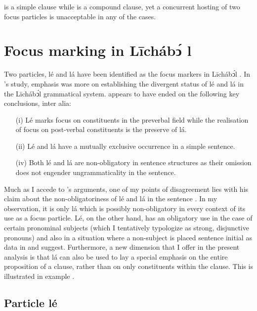 \documentclass[output=paper,colorlinks,citecolor=brown]{langscibook}
\begin{document}
 is a simple clause while  is a compound clause, yet a concurrent hosting of two focus particles is unacceptable in any of the cases.

\section{Focus marking in Līchábͻ́ l}\label{sec:bisilki:7}

Two particles, lé and lá have been identified as the focus markers in Līchábͻ́l \citep{Schwarz2009}. In \citeauthor{Schwarz2009}’s study, emphasis was more on establishing the divergent status of lé and lá in the Līchábͻ́l grammatical system. \citeauthor{Schwarz2009} appears to have ended on the following key conclusions, inter alia:

\begin{itemize}
    \item[(i)]  Lé marks focus on constituents in the preverbal field while the realisation of focus on post-verbal constituents is the preserve of lá.
    \item[(ii)] Lé and lá have a mutually exclusive occurrence in a simple sentence.
    \item[(iv)] Both lé and lá are non-obligatory in sentence structures as their omission does not engender ungrammaticality in the sentence.
\end{itemize}

Much as I accede to \citeauthor{Schwarz2009}’s arguments, one of my points of disagreement lies with his claim about the non-obligatoriness of lé and lá in the sentence \citep[184--185]{Schwarz2009}. In my observation, it is only lá which is possibly non-obligatory in every context of its use as a focus particle. Lé, on the other hand, has an obligatory use in the case of certain pronominal subjects (which I tentatively typologize as strong, disjunctive pronouns) and also in a situation where a non-subject is placed sentence initial as data in  and  suggest. Furthermore, a new dimension that I offer in the present analysis is that lá can also be used to lay a special emphasis on the entire proposition of a clause, rather than on only constituents within the clause. This is illustrated in example .

\subsection{Particle lé}\label{sec:bisilki:7.1}
\end{document}
